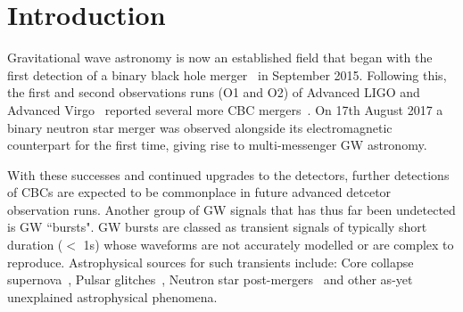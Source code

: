 \documentclass[12pt]{iopart}
\begin{document}
\section{Introduction}

%
Gravitational wave astronomy is now an established field that began with the first
detection of a binary black hole merger~\cite{Abbott2016} in September 2015.
Following this, the first and second observations runs (O1 and O2) of Advanced
LIGO and Advanced Virgo~\cite{Prospects-dets, AdvLIGO, AdvLIGO2, AdvVIRGO}
reported several more \ac{CBC} mergers~\cite{Abbott2016a, Abbott2017,
Abbott2017a, Abbott2017b}. On 17th August 2017 a binary neutron star merger was
observed alongside its electromagnetic counterpart for the first time, giving
rise to multi-messenger \ac{GW} astronomy. 

%
With these successes and continued upgrades to the detectors, further
detections of \acp{CBC} are expected to be commonplace in future advanced
detcetor observation runs. Another group of \ac{GW} signals that has thus far
been undetected is \ac{GW} ``bursts". \ac{GW} bursts are classed as transient
signals of typically short duration ($<$ 1s) whose waveforms are not accurately
modelled or are complex to reproduce. Astrophysical sources for such transients
include: Core collapse supernova~\cite{Fryer_2003}, Pulsar
glitches~\cite{Andersson_2001}, Neutron star post-mergers~\cite{Baiotti_2007}
and other as-yet unexplained astrophysical phenomena. 
\end{document}
